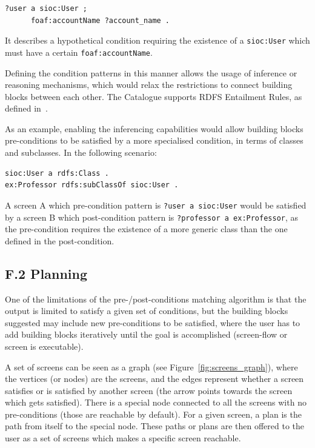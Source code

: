 \documentclass{fast_latex}
\begin{document}
\singlespacing
\begin{verbatim}
?user a sioc:User ;
      foaf:accountName ?account_name .
\end{verbatim}
\doublespacing

It describes a hypothetical condition requiring the existence of a \verb|sioc:User| which must have a certain \verb|foaf:accountName|.

Defining the condition patterns in this manner allows the usage of inference or reasoning mechanisms, which would relax the restrictions to connect building blocks between each other. The Catalogue supports RDFS Entailment Rules, as defined in~\cite{patrickHayes2004rdfSemantics}.

As an example, enabling the inferencing capabilities would allow building blocks pre-conditions to be satisfied by a more specialised condition, in terms of classes and subclasses. In the following scenario:

\singlespacing
\begin{verbatim}
sioc:User a rdfs:Class .
ex:Professor rdfs:subClassOf sioc:User .
\end{verbatim}
\doublespacing

A screen A which pre-condition pattern is \verb|?user a sioc:User| would be satisfied by a screen B which post-condition pattern is \verb|?professor a ex:Professor|, as the pre-condition requires the existence of a more generic class than the one defined in the post-condition.


\subsection*{F.2 Planning}

One of the limitations of the pre-/post-conditions matching algorithm is that the output is limited to satisfy a given set of conditions, but the building blocks suggested may include new pre-conditions to be satisfied, where the user has to add building blocks iteratively until the goal is accomplished (screen-flow or screen is executable).

A set of screens can be seen as a graph (see Figure~\ref{fig:screens_graph}), where the vertices (or nodes) are the screens, and the edges represent whether a screen satisfies or is satisfied by another screen (the arrow points towards the screen which gets satisfied). There is a special node connected to all the screens with no pre-conditions (those are reachable by default). For a given screen, a plan is the path from itself to the special node. These paths or plans are then offered to the user as a set of screens which makes a specific screen reachable.
\end{document}
